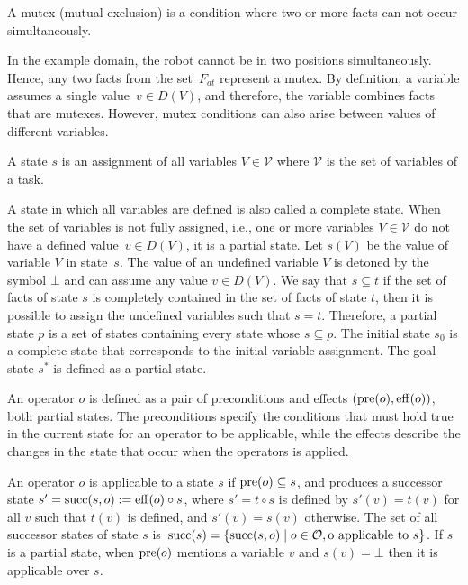 \begin{definition}[Mutex]\label{def:mutex}
    A mutex (mutual exclusion) is a condition where two or more facts can not occur simultaneously.
\end{definition}

In the example domain, the robot cannot be in two positions simultaneously. Hence, any two facts from the set~$F_{at}$ represent a mutex. By definition, a variable assumes a single value~$v \in D(V)$, and therefore, the variable combines facts that are mutexes. However, mutex conditions can also arise between values of different variables.

\begin{definition}[State]\label{def:state}
    A state $s$ is an assignment of all variables $V \in \mathcal{V}$ where $\mathcal{V}$ is the set of variables of a task.
\end{definition}

A state in which all variables are defined is also called a complete state. When the set of variables is not fully assigned, i.e., one or more variables $V \in \mathcal{V}$ do not have a defined value~$v \in D(V)$, it is a partial state. Let $s(V)$ be the value of variable $V$ in state~$s$. The value of an undefined variable $V$ is detoned by the symbol $\bot$ and can assume any value $v \in D(V)$. We say that $s \subseteq t$ if the set of facts of state $s$ is completely contained in the set of facts of state $t$, then it is possible to assign the undefined variables such that $s = t$. Therefore, a partial state $p$ is a set of states containing every state whose $s \subseteq p$. The initial state $s_0$ is a complete state that corresponds to the initial variable assignment. The goal state $s^*$ is defined as a partial state.

\begin{definition}[Operator]\label{def:operator}
    An operator $o$ is defined as a pair of preconditions and effects $(\operatorname{pre}(o),\operatorname{eff}(o))$, both partial states. The preconditions specify the conditions that must hold true in the current state for an operator to be applicable, while the effects describe the changes in the state that occur when the operators is applied.
\end{definition}

An operator $o$ is applicable to a state $s$ if $\operatorname{pre}(o) \subseteq s$, and produces a successor state $s'=\operatorname{succ}(s,o):=\operatorname{eff}(o)\circ s$, where $s'=t\circ s$ is defined by $s'(v)=t(v)$ for all $v$ such that $t(v)$ is defined, and $s'(v)=s(v)$ otherwise. The set of all successor states of state $s$ is~$\operatorname{succ}(s)=\{\operatorname{succ}(s,o)\mid o\in \mathcal{O}, \text{o applicable to }s\}$. If $s$ is a partial state, when $\operatorname{pre}(o)$ mentions a variable $v$ and $s(v) = \bot$ then it is applicable over $s$.

